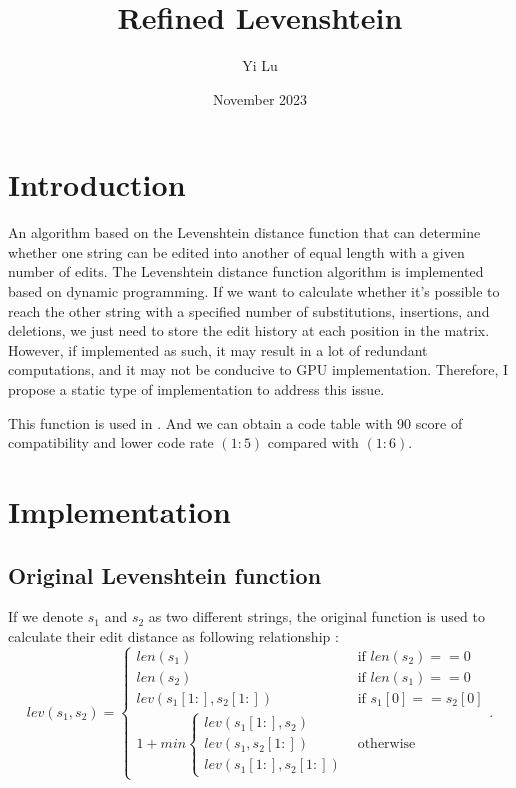 \documentclass{article}
\title{Refined Levenshtein}
\author{Yi Lu}
\date{November 2023}
\begin{document}
\maketitle
\tableofcontents
\newpage

\section{Introduction}
An algorithm based on the Levenshtein distance function that can determine whether one string can be edited into another of equal length with a given number of edits. The Levenshtein distance function algorithm is implemented based on dynamic programming. If we want to calculate whether it's possible to reach the other string with a specified number of substitutions, insertions, and deletions, we just need to store the edit history at each position in the matrix. However, if implemented as such, it may result in a lot of redundant computations, and it may not be conducive to GPU implementation. Therefore, I propose a static type of implementation to address this issue.

This function is used in \cite{ref1}. And we can obtain a code table with 90 score of compatibility and lower code rate $(1:5)$ compared with $(1:6)$.

\section{Implementation}
\subsection{Original Levenshtein function}
If we denote $s_1$ and $s_2$ as two different strings, the original function is used to calculate their edit distance as following relationship \cite{ref2}:
\[
lev(s_1,s_2) = 
  \begin{cases} 
   len(s_1) & \text{if } len(s_2) == 0 \\
   len(s_2) & \text{if } len(s_1) == 0 \\
   lev(s_1[1:], s_2[1:]) & \text{if } s_1[0] == s_2[0]\\ 
   1 +min\begin{cases}
       lev(s_1[1:], s_2)\\
       lev(s_1, s_2[1:])\\
       lev(s_1[1:], s_2[1:])
   \end{cases} & \text{otherwise}
  \end{cases}.
\]
\end{document}
